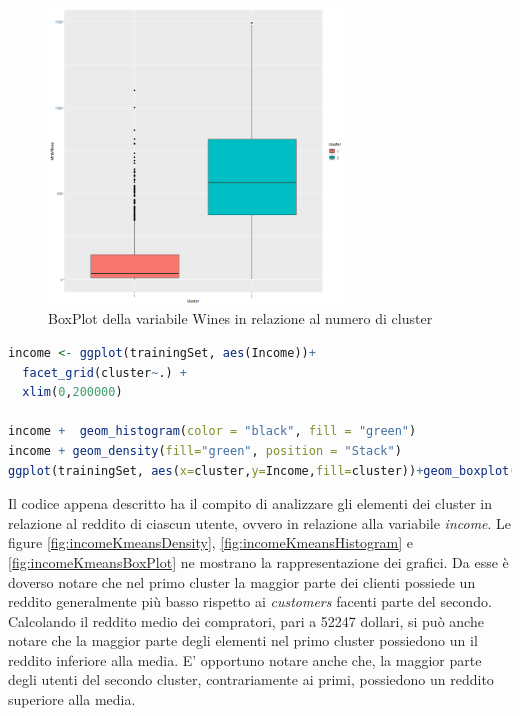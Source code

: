 \documentclass[letterpaper,11pt]{article}
\begin{document}
\begin{figure}[H]
    \centering
    \includegraphics[width=0.7\textwidth]{Img/K-MEANS/KMEANS009.png}
    \caption{BoxPlot della variabile Wines in relazione al numero di cluster}
    \label{fig:winesKmeansBoxPlot}
\end{figure}

\begin{lstlisting}[language=R]
income <- ggplot(trainingSet, aes(Income))+ 
  facet_grid(cluster~.) + 
  xlim(0,200000)

income +  geom_histogram(color = "black", fill = "green")
income + geom_density(fill="green", position = "Stack")
ggplot(trainingSet, aes(x=cluster,y=Income,fill=cluster))+geom_boxplot(outlier.colour="black") + ylim(0,200000)
\end{lstlisting}
Il codice appena descritto ha il compito di analizzare gli elementi dei cluster in relazione al reddito di ciascun utente, ovvero in relazione alla variabile \textit{income}. Le figure \ref{fig:incomeKmeansDensity}, \ref{fig:incomeKmeansHistogram} e \ref{fig:incomeKmeansBoxPlot} ne mostrano la rappresentazione dei grafici. Da esse è doverso notare che nel primo cluster la maggior parte dei clienti possiede un reddito generalmente più basso rispetto ai \textit{customers} facenti parte del secondo. Calcolando il reddito medio dei compratori, pari a 52247 dollari, si può anche notare che la maggior parte degli elementi nel primo cluster possiedono un il reddito inferiore alla media. E' opportuno notare anche che, la maggior parte degli utenti del secondo cluster, contrariamente ai primi, possiedono un reddito superiore alla media.
\end{document}
